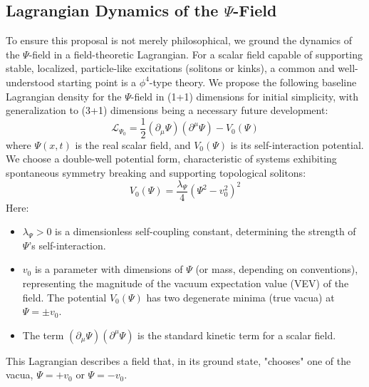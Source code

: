 \documentclass[11pt, a4paper]{book}
\begin{document}
\subsection{Lagrangian Dynamics of the $\Psi$-Field}
\label{ssec:psisubstrate_lagrangian_mainpaper}
To ensure this proposal is not merely philosophical, we ground the dynamics of the $\Psi$-field in a field-theoretic Lagrangian. For a scalar field capable of supporting stable, localized, particle-like excitations (solitons or kinks), a common and well-understood starting point is a $\phi^4$-type theory. We propose the following baseline Lagrangian density for the $\Psi$-field in (1+1) dimensions for initial simplicity, with generalization to (3+1) dimensions being a necessary future development:
\[ \mathcal{L}_{\Psi_0} = \frac{1}{2}(\partial_\mu \Psi)(\partial^\mu \Psi) - V_0(\Psi) \]
where $\Psi(x,t)$ is the real scalar field, and $V_0(\Psi)$ is its self-interaction potential. We choose a double-well potential form, characteristic of systems exhibiting spontaneous symmetry breaking and supporting topological solitons:
\[ V_0(\Psi) = \frac{\lambda_\Psi}{4}(\Psi^2 - v_0^2)^2 \]
Here:
\begin{itemize}
    \item $\lambda_\Psi > 0$ is a dimensionless self-coupling constant, determining the strength of $\Psi$'s self-interaction.
    \item $v_0$ is a parameter with dimensions of $\Psi$ (or mass, depending on conventions), representing the magnitude of the vacuum expectation value (VEV) of the field. The potential $V_0(\Psi)$ has two degenerate minima (true vacua) at $\Psi = \pm v_0$.
    \item The term $(\partial_\mu \Psi)(\partial^\mu \Psi)$ is the standard kinetic term for a scalar field.
\end{itemize}
This Lagrangian describes a field that, in its ground state, "chooses" one of the vacua, $\Psi = +v_0$ or $\Psi = -v_0$.
\end{document}
